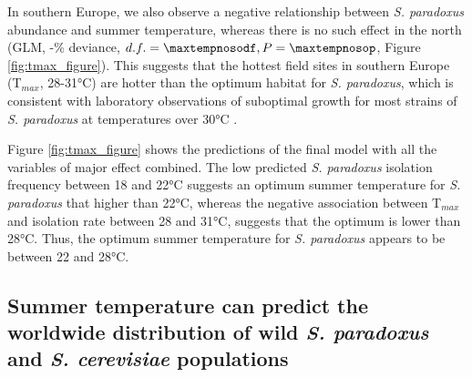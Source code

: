 \documentclass[12pt]{article}
\begin{document}
\begin{linenumbers}
In southern Europe, we also observe a negative relationship between \textit{S. paradoxus} abundance and summer temperature, whereas there is no such effect in the north (GLM, -\maxtempnosodev\% deviance, $d.f.=\maxtempnosodf,P=\maxtempnosop$, Figure \ref{fig:tmax_figure}). This suggests that the hottest field sites in southern Europe (T$_{max}$, 28-31\si{\degreeCelsius}) are hotter than the optimum habitat for \textit{S. paradoxus}, which is consistent with laboratory observations of suboptimal growth for most strains of \textit{S. paradoxus} at temperatures over 30\si{\degreeCelsius} \citep{sweeney_sympatric_2004,salvado_temperature_2011,leducq_local_2014}.

Figure \ref{fig:tmax_figure} shows the predictions of the final model with all the variables of major effect combined. The low predicted \textit{S. paradoxus} isolation frequency between 18 and 22\si{\degreeCelsius} suggests an optimum summer temperature for \textit{S. paradoxus} that higher than 22\si{\degreeCelsius}, whereas the negative association between T$_{max}$ and isolation rate between 28 and 31\si{\degreeCelsius}, suggests that the optimum is lower than 28\si{\degreeCelsius}. Thus, the optimum summer temperature for \textit{S. paradoxus} appears to be between 22 and 28\si{\degreeCelsius}. 

\subsection*{Summer temperature can predict the worldwide distribution of wild \textit{S. paradoxus} and \textit{S. cerevisiae} populations}


\end{linenumbers}
\end{document}
